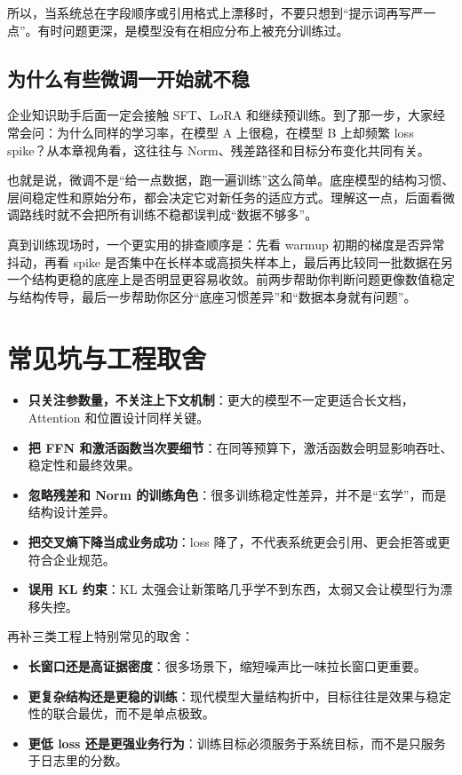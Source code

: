 所以，当系统总在字段顺序或引用格式上漂移时，不要只想到“提示词再写严一点”。有时问题更深，是模型没有在相应分布上被充分训练过。

\subsection{为什么有些微调一开始就不稳}
企业知识助手后面一定会接触 SFT、LoRA 和继续预训练。到了那一步，大家经常会问：为什么同样的学习率，在模型 A 上很稳，在模型 B 上却频繁 loss spike？从本章视角看，这往往与 Norm、残差路径和目标分布变化共同有关。

也就是说，微调不是“给一点数据，跑一遍训练”这么简单。底座模型的结构习惯、层间稳定性和原始分布，都会决定它对新任务的适应方式。理解这一点，后面看微调路线时就不会把所有训练不稳都误判成“数据不够多”。

真到训练现场时，一个更实用的排查顺序是：先看 warmup 初期的梯度是否异常抖动，再看 spike 是否集中在长样本或高损失样本上，最后再比较同一批数据在另一个结构更稳的底座上是否明显更容易收敛。前两步帮助你判断问题更像数值稳定与结构传导，最后一步帮助你区分“底座习惯差异”和“数据本身就有问题”。

\section{常见坑与工程取舍}
\begin{itemize}
  \item \textbf{只关注参数量，不关注上下文机制}：更大的模型不一定更适合长文档，Attention 和位置设计同样关键。
  \item \textbf{把 FFN 和激活函数当次要细节}：在同等预算下，激活函数会明显影响吞吐、稳定性和最终效果。
  \item \textbf{忽略残差和 Norm 的训练角色}：很多训练稳定性差异，并不是“玄学”，而是结构设计差异。
  \item \textbf{把交叉熵下降当成业务成功}：loss 降了，不代表系统更会引用、更会拒答或更符合企业规范。
  \item \textbf{误用 KL 约束}：KL 太强会让新策略几乎学不到东西，太弱又会让模型行为漂移失控。
\end{itemize}

再补三类工程上特别常见的取舍：
\begin{itemize}
  \item \textbf{长窗口还是高证据密度}：很多场景下，缩短噪声比一味拉长窗口更重要。
  \item \textbf{更复杂结构还是更稳的训练}：现代模型大量结构折中，目标往往是效果与稳定性的联合最优，而不是单点极致。
  \item \textbf{更低 loss 还是更强业务行为}：训练目标必须服务于系统目标，而不是只服务于日志里的分数。
\end{itemize}


